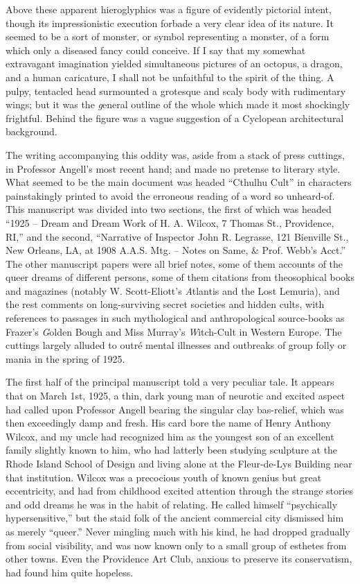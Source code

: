 Above these apparent hieroglyphics was a figure of evidently pictorial intent, though its impressionistic execution forbade a very clear idea of its nature. It seemed to be a sort of monster, or symbol representing a monster, of a form which only a diseased fancy could conceive. If I say that my somewhat extravagant imagination yielded simultaneous pictures of an octopus, a dragon, and a human caricature, I shall not be unfaithful to the spirit of the thing. A pulpy, tentacled head surmounted a grotesque and scaly body with rudimentary wings; but it was the {\emph general outline} of the whole which made it most shockingly frightful. Behind the figure was a vague suggestion of a Cyclopean architectural background.

The writing accompanying this oddity was, aside from a stack of press cuttings, in Professor Angell’s most recent hand; and made no pretense to literary style. What seemed to be the main document was headed “{\sc Cthulhu Cult}” in characters painstakingly printed to avoid the erroneous reading of a word so unheard-of. This manuscript was divided into two sections, the first of which was headed “1925⁠ – Dream and Dream Work of H. A. Wilcox, 7 Thomas St., Providence, RI,” and the second, “Narrative of Inspector John R. Legrasse, 121 Bienville St., New Orleans, LA, at 1908 A.A.S. Mtg.⁠ – Notes on Same, \& Prof. Webb’s Acct.” The other manuscript papers were all brief notes, some of them accounts of the queer dreams of different persons, some of them citations from theosophical books and magazines (notably W. Scott-Eliott’s {\emph Atlantis and the Lost Lemuria}), and the rest comments on long-surviving secret societies and hidden cults, with references to passages in such mythological and anthropological source-books as Frazer’s {\emph Golden Bough} and Miss Murray’s {\emph Witch-Cult in Western Europe}. The cuttings largely alluded to outré mental illnesses and outbreaks of group folly or mania in the spring of 1925.

\sectionbreak

The first half of the principal manuscript told a very peculiar tale. It appears that on March 1st, 1925, a thin, dark young man of neurotic and excited aspect had called upon Professor Angell bearing the singular clay bas-relief, which was then exceedingly damp and fresh. His card bore the name of Henry Anthony Wilcox, and my uncle had recognized him as the youngest son of an excellent family slightly known to him, who had latterly been studying sculpture at the Rhode Island School of Design and living alone at the Fleur-de-Lys Building near that institution. Wilcox was a precocious youth of known genius but great eccentricity, and had from childhood excited attention through the strange stories and odd dreams he was in the habit of relating. He called himself “psychically hypersensitive,” but the staid folk of the ancient commercial city dismissed him as merely “queer.” Never mingling much with his kind, he had dropped gradually from social visibility, and was now known only to a small group of esthetes from other towns. Even the Providence Art Club, anxious to preserve its conservatism, had found him quite hopeless.

